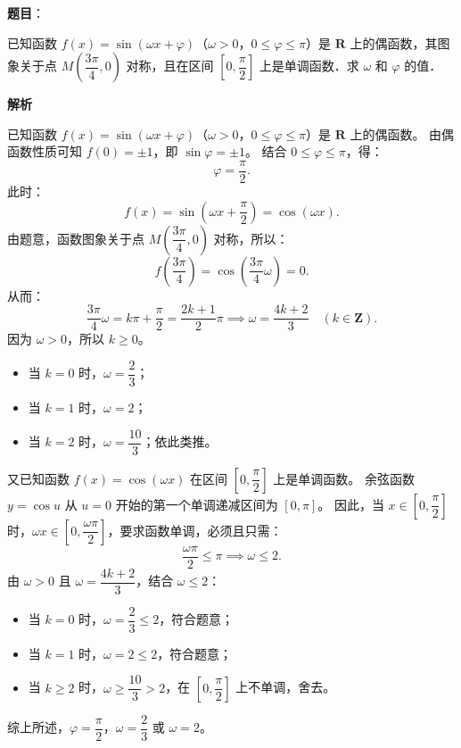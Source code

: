 \begin{answer}

\textbf{题目}：

已知函数 $f(x) = \sin(\omega x + \varphi)$（$\omega > 0$，$0 \le \varphi \le \pi$）是 $\mathbf{R}$ 上的偶函数，其图象关于点 $M\left(\dfrac{3\pi}{4}, 0\right)$ 对称，且在区间 $\left[0, \dfrac{\pi}{2}\right]$ 上是单调函数．求 $\omega$ 和 $\varphi$ 的值．

\textbf{解析}

已知函数 $f(x) = \sin(\omega x + \varphi)$（$\omega > 0$，$0 \le \varphi \le \pi$）是 $\mathbf{R}$ 上的偶函数。
由偶函数性质可知 $f(0) = \pm 1$，即 $\sin\varphi = \pm 1$。
结合 $0 \le \varphi \le \pi$，得：
\nopagebreak[4]
\[\varphi = \frac{\pi}{2}.\]
此时：
\nopagebreak[4]
\[f(x) = \sin\left(\omega x + \frac{\pi}{2}\right) = \cos(\omega x).\]
由题意，函数图象关于点 $M\left(\dfrac{3\pi}{4}, 0\right)$ 对称，所以：
\nopagebreak[4]
\[f\left(\frac{3\pi}{4}\right) = \cos\left(\frac{3\pi}{4}\omega\right) = 0.\]
从而：
\nopagebreak[4]
\[\frac{3\pi}{4}\omega = k\pi + \frac{\pi}{2} = \frac{2k+1}{2}\pi \implies \omega = \frac{4k+2}{3} \quad (k \in \mathbf{Z}).\]
因为 $\omega > 0$，所以 $k \ge 0$。
\begin{itemize}
\item 当 $k = 0$ 时，$\omega = \dfrac{2}{3}$；
\item 当 $k = 1$ 时，$\omega = 2$；
\item 当 $k = 2$ 时，$\omega = \dfrac{10}{3}$；依此类推。
\end{itemize}
又已知函数 $f(x) = \cos(\omega x)$ 在区间 $\left[0, \dfrac{\pi}{2}\right]$ 上是单调函数。
余弦函数 $y = \cos u$ 从 $u = 0$ 开始的第一个单调递减区间为 $[0, \pi]$。
因此，当 $x \in \left[0, \dfrac{\pi}{2}\right]$ 时，$\omega x \in \left[0, \dfrac{\omega\pi}{2}\right]$，要求函数单调，必须且只需：
\nopagebreak[4]
\[\frac{\omega\pi}{2} \le \pi \implies \omega \le 2.\]
由 $\omega > 0$ 且 $\omega = \dfrac{4k+2}{3}$，结合 $\omega \le 2$：
\begin{itemize}
\item 当 $k = 0$ 时，$\omega = \dfrac{2}{3} \le 2$，符合题意；
\item 当 $k = 1$ 时，$\omega = 2 \le 2$，符合题意；
\item 当 $k \ge 2$ 时，$\omega \ge \dfrac{10}{3} > 2$，在 $\left[0, \dfrac{\pi}{2}\right]$ 上不单调，舍去。
\end{itemize}

综上所述，$\varphi = \dfrac{\pi}{2}$，$\omega = \dfrac{2}{3}$ 或 $\omega = 2$。


\end{answer}

